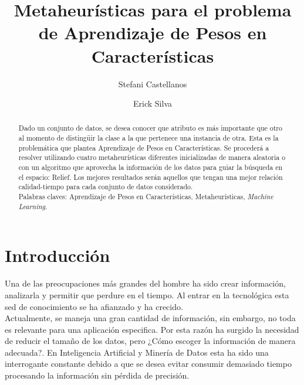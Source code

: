 \documentclass{ci5652}
\title{Metaheurísticas para el problema de Aprendizaje de Pesos en Características}
\author{Stefani Castellanos
        \and
        Erick Silva}
\begin{document}
\thispagestyle{empty}
\maketitle


\begin{abstract}

{\small Dado un conjunto de datos, se desea conocer que atributo es más
importante que otro al momento de distingüir la clase a la que pertenece una
instancia de otra. Esta es la problemática que plantea Aprendizaje de Pesos en
Características. Se procederá a resolver utilizando cuatro metaheurísticas
diferentes inicializadas de manera aleatoria o con un algoritmo que aprovecha la
información de los datos para guiar la búsqueda en el espacio: Relief. Los
mejores resultados serán aquellos que tengan una mejor relación calidad-tiempo
para cada conjunto de datos considerado.\\

Palabras claves: Aprendizaje de Pesos en Características, Metaheurísticas,
\textit{Machine Learning}}.
\end{abstract}


\section*{Introducción}

Una de las preocupaciones más grandes del hombre ha sido crear información,
analizarla y permitir que perdure en el tiempo. Al entrar en la tecnológica esta
sed de conocimiento se ha afianzado y ha crecido.\\

Actualmente, se maneja una gran cantidad de información, sin embargo, no toda es
relevante para una aplicación especifica. Por esta razón ha surgido la necesidad
de reducir el tamaño de los datos, pero ¿Cómo escoger la información de manera
adecuada?. En Inteligencia Artificial y Minería de Datos esta ha sido una
interrogante constante debido a que se desea evitar consumir demasiado tiempo
procesando la información sin pérdida de precisión.\\
\end{document}
